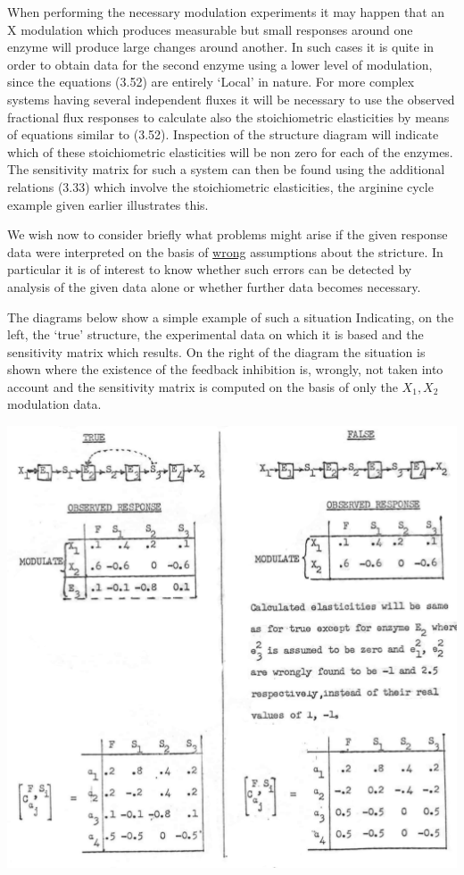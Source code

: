 When performing the necessary modulation experiments it may happen that an X modulation which produces measurable but small responses around one enzyme will produce large changes around another. In such cases it is quite in order to obtain data for the second enzyme using a lower level of modulation, since the equations (3.52) are entirely `Local' in nature. For more complex systems having several independent fluxes it will be necessary to use the observed fractional flux responses to calculate also the stoichiometric elasticities by means of equations similar to (3.52). Inspection of the structure diagram will indicate which of these stoichiometric elasticities will be non zero for each of the enzymes. The sensitivity matrix for such a system can then be found using the additional relations (3.33) which involve the stoichiometric elasticities, the arginine cycle example given earlier illustrates this.

We wish now to consider briefly what problems might arise if the given response data were interpreted on the basis of \underline{wrong} assumptions about the stricture. In particular it is of interest to know whether such errors can be detected by analysis of the given data alone or whether further data becomes necessary.

The diagrams below show a simple example of such a situation Indicating, on the left, the `true' structure, the experimental data on which it is based and the sensitivity matrix which results. On the right of the diagram the situation is shown where the existence of the feedback inhibition is, wrongly, not taken into account and the sensitivity matrix is computed on the basis of only the $X_{1}, X_{2}$ modulation data.


\begin{center}
\includegraphics[max width=\textwidth]{figure3_observed.png}
\end{center}

